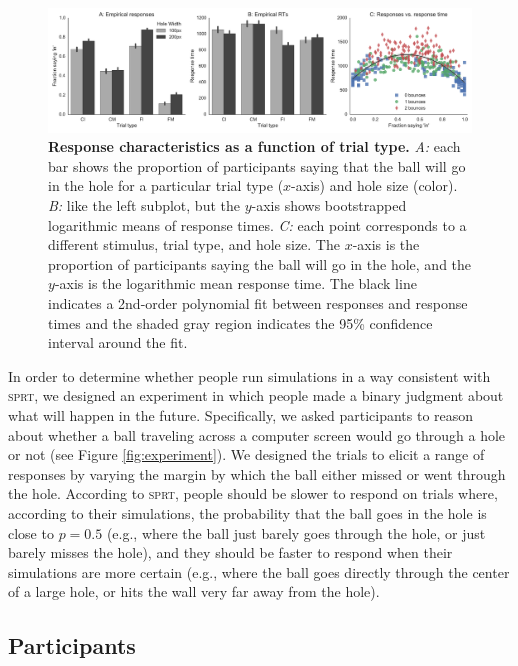 \documentclass[10pt,letterpaper]{article}
\begin{document}
\begin{figure}[t]
    \begin{center}
        \includegraphics[width=\textwidth]{figures/hole_empirical_results.pdf}
        \caption{\textbf{Response characteristics as a function of trial type.}
        \emph{A:} each bar shows the proportion of participants saying that the ball will go in the hole for a particular trial type ($x$-axis) and hole size (color).
        \emph{B:} like the left subplot, but the $y$-axis shows bootstrapped logarithmic means of response times. 
        \emph{C:} each point corresponds to a different stimulus, trial type, and hole size.  
        The $x$-axis is the proportion of participants saying the ball will go in the hole, and the $y$-axis is the logarithmic mean response time. 
        The black line indicates a 2nd-order polynomial fit between responses and response times and the shaded gray region indicates the 95\% confidence interval around the fit.}
        \label{fig:pct-vs-rt}
    \end{center}
\end{figure}

In order to determine whether people run simulations in a way consistent with \textsc{sprt}, we designed an experiment in which people made a binary judgment about what will happen in the future.
Specifically, we asked participants to reason about whether a ball traveling across a computer screen would go through a hole or not (see Figure \ref{fig:experiment}).
We designed the trials to elicit a range of responses by varying the margin by which the ball either missed or went through the hole.
According to \textsc{sprt}, people should be slower to respond on trials where, according to their simulations, the probability that the ball goes in the hole is close to $p=0.5$ (e.g., where the ball just barely goes through the hole, or just barely misses the hole), and they should be faster to respond when their simulations are more certain (e.g., where the ball goes directly through the center of a large hole, or hits the wall very far away from the hole).

\subsection{Participants}
\end{document}
